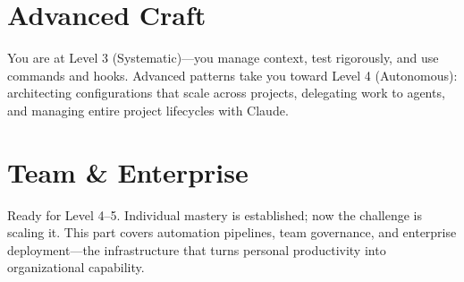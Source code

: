 \documentclass[10pt,oneside,open=any]{scrbook}
\begin{document}




\part{Advanced Craft}
\label{part:advanced}

\begin{partintro}
You are at Level 3 (Systematic)---you manage context, test rigorously, and use
commands and hooks. Advanced patterns take you toward Level 4 (Autonomous):
architecting configurations that scale across projects, delegating work to agents,
and managing entire project lifecycles with Claude.
\end{partintro}









\part{Team \& Enterprise}
\label{part:enterprise}

\begin{partintro}
Ready for Level 4--5. Individual mastery is established; now the challenge
is scaling it. This part covers automation pipelines, team governance,
and enterprise deployment---the infrastructure that turns personal
productivity into organizational capability.
\end{partintro}







\appendix








\printindex
\end{document}
